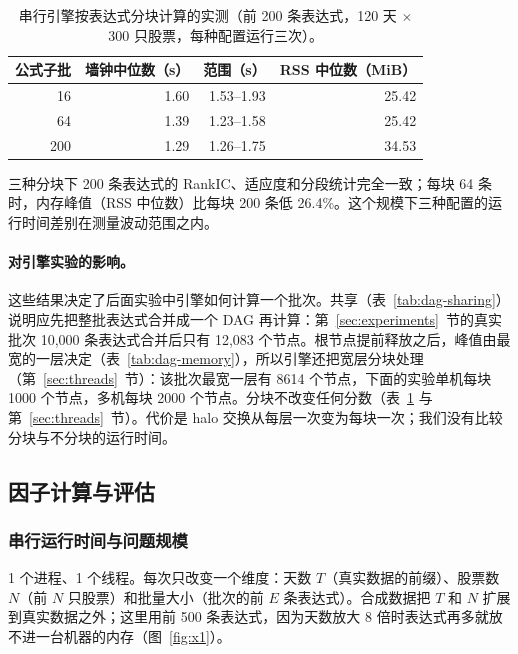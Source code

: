 \documentclass[11pt,a4paper,UTF8,fontset=fandol]{ctexart}
\begin{document}
\begin{table}[htbp]
\centering
\begin{tabular}{rrrr}
\toprule
公式子批 & 墙钟中位数（s） & 范围（s） & RSS 中位数（MiB） \\
\midrule
16 & 1.60 & 1.53--1.93 & 25.42 \\
64 & 1.39 & 1.23--1.58 & 25.42 \\
200 & 1.29 & 1.26--1.75 & 34.53 \\
\bottomrule
\end{tabular}
\caption{串行引擎按表达式分块计算的实测（前 200 条表达式，120 天 $\times$ 300 只股票，每种配置运行三次）。}
\label{tab:dag-s4}
\end{table}
三种分块下 200 条表达式的 RankIC、适应度和分段统计完全一致；每块 64 条时，内存峰值（RSS 中位数）比每块 200 条低 26.4\%。这个规模下三种配置的运行时间差别在测量波动范围之内。

\paragraph{对引擎实验的影响。}这些结果决定了后面实验中引擎如何计算一个批次。共享（表~\ref{tab:dag-sharing}）说明应先把整批表达式合并成一个 DAG 再计算：第~\ref{sec:experiments}~节的真实批次 10{,}000 条表达式合并后只有 12{,}083 个节点。根节点提前释放之后，峰值由最宽的一层决定（表~\ref{tab:dag-memory}），所以引擎还把宽层分块处理（第~\ref{sec:threads}~节）：该批次最宽一层有 8614 个节点，下面的实验单机每块 1000 个节点，多机每块 2000 个节点。分块不改变任何分数（表~\ref{tab:dag-s4} 与第~\ref{sec:threads}~节）。代价是 halo 交换从每层一次变为每块一次；我们没有比较分块与不分块的运行时间。

\subsection{因子计算与评估}
\label{sec:fc-exp}

\subsubsection{串行运行时间与问题规模}
\label{sec:x1}
1 个进程、1 个线程。每次只改变一个维度：天数 $T$（真实数据的前缀）、股票数 $N$（前 $N$ 只股票）和批量大小（批次的前 $E$ 条表达式）。合成数据把 $T$ 和 $N$ 扩展到真实数据之外；这里用前 500 条表达式，因为天数放大 8 倍时表达式再多就放不进一台机器的内存（图~\ref{fig:x1}）。
\end{document}
